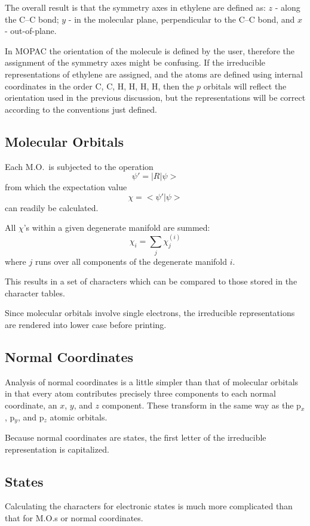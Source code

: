 The overall result is that the symmetry axes in ethylene are defined as: $z$ -
along the C--C bond; $y$ - in the molecular plane, perpendicular to the C--C
bond, and $x$ - out-of-plane.

In MOPAC the orientation of the molecule is defined by the user, therefore the
assignment of the symmetry axes might be confusing.  If the irreducible
representations of ethylene are assigned, and the atoms are defined  using
internal coordinates in the order C, C, H, H, H, H, then the $p$ orbitals will
reflect the orientation used in the previous discussion, but the
representations will be correct according to the conventions just defined.

\subsection{Molecular Orbitals}
Each M.O.\ is subjected to the operation
$$
\psi' = |R|\psi>
$$
from which the expectation value
$$
\chi=<\psi'|\psi>
$$
can readily be calculated.

All $\chi$'s within a given degenerate manifold are summed:
$$
\chi_i = \sum_j\chi_j^{(i)}
$$
where $j$ runs over all components of the degenerate manifold $i$.

This results in a set of characters which can be compared to those stored in
the character tables.  

Since molecular orbitals involve single electrons, the irreducible
representations  are rendered into lower
case before printing. 

\subsection{Normal Coordinates}
 
Analysis of normal coordinates is a little simpler than that of molecular
orbitals in that every atom contributes precisely three components to each
normal coordinate, an $x$, $y$, and $z$ component.  These transform in the same
way as the p$_x$, p$_y$, and p$_z$ atomic orbitals.

Because normal coordinates are states, the first letter of the irreducible
representation is capitalized.

\subsection{States}
Calculating the characters for electronic states is much more complicated than
that for M.O.s or normal coordinates.  

